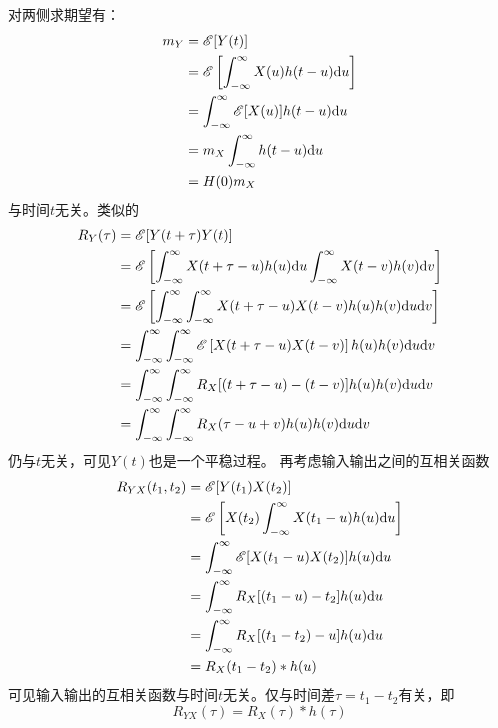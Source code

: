     对两侧求期望有：
    \begin{equation}
        \begin{split}
            m_Y &=\mathscr{E}[Y(t)]\\
                &=\mathscr{E}\left[\int_{-\infty}^{\infty}X(u)h(t-u)\text{\upshape d} u\right]\\
                &=\int_{-\infty}^{\infty}\mathscr{E}[X(u)]h(t-u)\text{\upshape d} u\\
                &=m_X\int_{-\infty}^{\infty}h(t-u)\text{\upshape d} u\\
                &=H(0)m_X
        \end{split}
    \end{equation}
    与时间$t$无关。类似的
    \begin{equation}\label{eq:stoc_RY}
        \begin{split}
            R_Y(\tau)   &=\mathscr{E}[Y(t+\tau)Y(t)]\\
                        &=\mathscr{E}\left[\int_{-\infty}^{\infty}X(t+\tau-u)h(u)\text{\upshape d} u\int_{-\infty}^{\infty}X(t-v)h(v)\text{\upshape d} v\right]\\
                        &=\mathscr{E}\left[\int_{-\infty}^{\infty}\int_{-\infty}^{\infty}X(t+\tau-u)X(t-v)h(u)h(v)\text{\upshape d} u\text{\upshape d} v\right]\\
                        &=\int_{-\infty}^{\infty}\int_{-\infty}^{\infty}\mathscr{E}\left[X(t+\tau-u)X(t-v)\right]h(u)h(v)\text{\upshape d} u\text{\upshape d} v\\
                        &=\int_{-\infty}^{\infty}\int_{-\infty}^{\infty}R_X[(t+\tau-u)-(t-v)]h(u)h(v)\text{\upshape d} u\text{\upshape d} v\\
                        &=\int_{-\infty}^{\infty}\int_{-\infty}^{\infty}R_X(\tau-u+v)h(u)h(v)\text{\upshape d} u\text{\upshape d} v
        \end{split}
    \end{equation}
    仍与$t$无关，可见$Y(t)$也是一个平稳过程。
    再考虑输入输出之间的互相关函数
    \begin{equation}
        \begin{split}
            R_{YX}(t_1,t_2) &=\mathscr{E}[Y(t_1)X(t_2)]\\
                            &=\mathscr{E}\left[X(t_2)\int_{-\infty}^{\infty}X(t_1-u)h(u)\text{\upshape d} u\right]\\
                            &=\int_{-\infty}^{\infty}\mathscr{E}[X(t_1-u)X(t_2)]h(u)\text{\upshape d} u\\
                            &=\int_{-\infty}^{\infty}R_X[(t_1-u)-t_2]h(u)\text{\upshape d} u\\
                            &=\int_{-\infty}^{\infty}R_X[(t_1-t_2)-u]h(u)\text{\upshape d} u\\
                            &=R_X(t_1-t_2)*h(u)
        \end{split}
    \end{equation}
    可见输入输出的互相关函数与时间$t$无关。仅与时间差$\tau=t_1-t_2$有关，即
    \begin{equation}
        R_{YX}(\tau)=R_X(\tau)*h(\tau)
    \end{equation}


